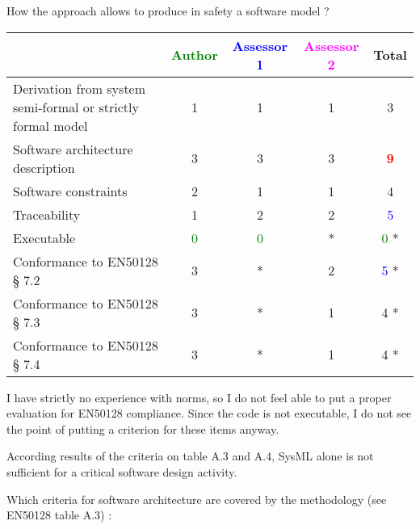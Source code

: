 How the approach allows to produce in safety a software model ?

\begin{tabular}{|l | c | c | c | c|}
\hline
& \textcolor{green}{Author} & \textcolor{blue}{Assessor 1} & \textcolor{magenta}{Assessor 2} & Total \\
\hline
Derivation from system semi-formal or strictly formal model & 1    & 1    & 1    & 3    \\
\hline
Software architecture description & 3    & 3    & 3    & \textcolor{red}{\textbf{9}} \\
\hline
Software constraints & 2    & 1    & 1    & 4    \\
\hline
Traceability & 1    & 2    & 2    & \textcolor{blue}{5} \\
\hline
Executable & \textcolor{green}{0} & \textcolor{green}{0} & * & \textcolor{green}{0} * \\
\hline
Conformance to EN50128 § 7.2 & 3    & * & 2    & \textcolor{blue}{5} * \\
\hline
Conformance to EN50128 § 7.3 & 3    & * & 1    & 4   * \\
\hline
Conformance to EN50128 § 7.4 & 3    & * & 1    & 4   * \\
\hline
\end{tabular}

\begin{assessor1}
I have strictly no experience with norms, so I do not feel able to put a proper evaluation for EN50128 compliance. Since the code is not executable, I do not see the point of putting a criterion for these items anyway. 
\end{assessor1}


\begin{assessor2}
According results of the criteria on table A.3 and A.4, SysML alone is not sufficient for a critical software design activity.
\end{assessor2}


Which criteria for software architecture are covered by the methodology
(see EN50128 table A.3) :

